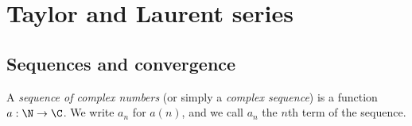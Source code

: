 \chapter{Taylor and Laurent series}

\section{Sequences and convergence}

\begin{definition}
    A \emph{sequence of complex numbers} (or simply a \emph{complex sequence}) is a function $a: \N \to \C$. We write $a_n$ for $a(n)$, and we call $a_n$ the $n$th term of the sequence.
\end{definition}
